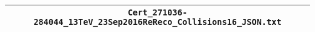 \begin{center}
\begin{tabular}{c}
\hline\hline
\verb!Cert_271036-284044_13TeV_23Sep2016ReReco_Collisions16_JSON.txt!\tabularnewline
\hline
\end{tabular}\end{center}
